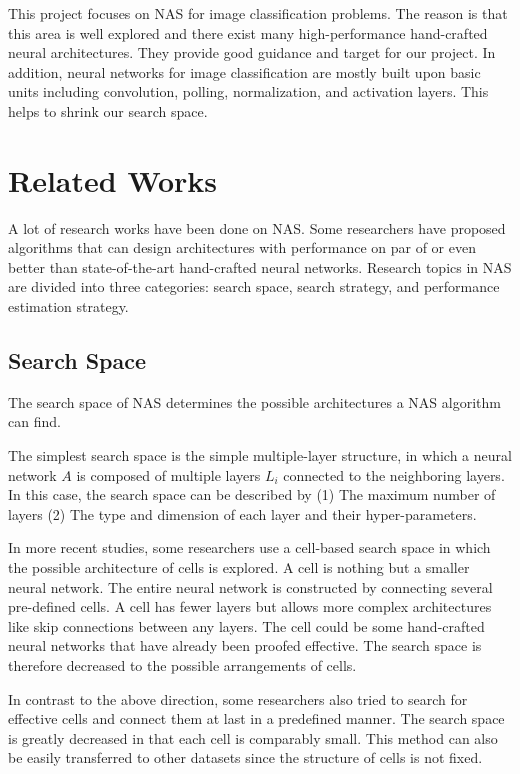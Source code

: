 \documentclass[conference]{IEEEtran}
\begin{document}
    This project focuses on NAS for image classification problems. The reason is that this area is well explored and there exist many high-performance hand-crafted neural architectures. They provide good guidance and target for our project. In addition, neural networks for image classification are mostly built upon basic units including convolution, polling, normalization, and activation layers. This helps to shrink our search space.
  


  \section{Related Works}
  A lot of research works have been done on NAS. Some researchers have proposed algorithms that can design architectures with performance on par of or even better than state-of-the-art hand-crafted neural networks. Research topics in NAS are divided into three categories: search space, search strategy, and performance estimation strategy.
  
  \subsection{Search Space}
  
  The search space of NAS determines the possible architectures a NAS algorithm can find.

  The simplest search space is the simple multiple-layer structure, in which a neural network $A$ is composed of multiple layers $L_i$ connected to the neighboring layers. In this case, the search space can be described by (1) The maximum number of layers (2) The type and dimension of each layer and their hyper-parameters\cite{chollet2017xception}\cite{baker2016designing}. 

  In more recent studies, some researchers use a cell-based search space in which the possible architecture of cells is explored. A cell is nothing but a smaller neural network. The entire neural network is constructed by connecting several pre-defined cells. A cell has fewer layers but allows more complex architectures like skip connections between any layers\cite{cai2018path}\cite{real2018regularized}. The cell could be some hand-crafted neural networks that have already been proofed effective. The search space is therefore decreased to the possible arrangements of cells.

  In contrast to the above direction, some researchers also tried to search for effective cells and connect them at last in a predefined manner\cite{zoph2018learning}\cite{cai2018path}. The search space is greatly decreased in that each cell is comparably small. This method can also be easily transferred to other datasets\cite{zoph2018learning} since the structure of cells is not fixed.
\end{document}
